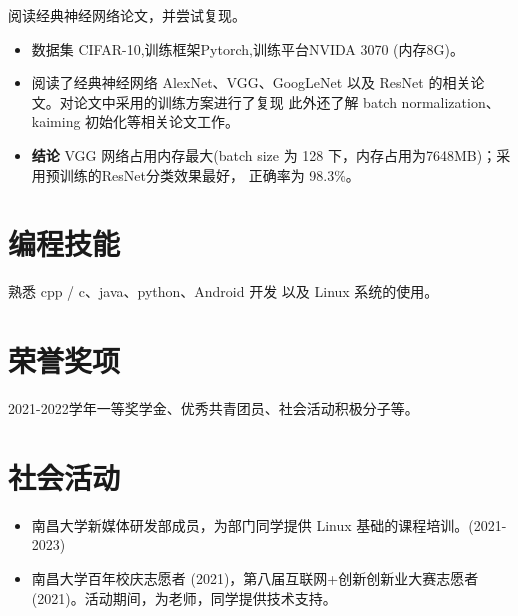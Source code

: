 \documentclass{resume}
\begin{document}
阅读经典神经网络论文，并尝试复现。
\begin{itemize}
  \item 数据集 CIFAR-10,训练框架Pytorch,训练平台NVIDA 3070 (内存8G)。
  \item 阅读了经典神经网络 AlexNet、VGG、GoogLeNet 以及 ResNet 的相关论文。对论文中采用的训练方案进行了复现
  此外还了解 batch normalization、kaiming 初始化等相关论文工作。
  \item \textbf{结论} VGG 网络占用内存最大(batch size 为 128 下，内存占用为7648MB)；采用预训练的ResNet分类效果最好，
  正确率为 98.3\%。 
\end{itemize} 


\section{编程技能}
熟悉 cpp / c、java、python、Android 开发 以及 Linux 系统的使用。

\section{荣誉奖项}
2021-2022学年一等奖学金、优秀共青团员、社会活动积极分子等。


\section{社会活动}
\begin{itemize}[parsep=0.2ex]
  \item 南昌大学新媒体研发部成员，为部门同学提供 Linux 基础的课程培训。(2021-2023)
  \item 南昌大学百年校庆志愿者 (2021)，第八届互联网+创新创新业大赛志愿者(2021)。活动期间，为老师，同学提供技术支持。
\end{itemize}
\end{document}
